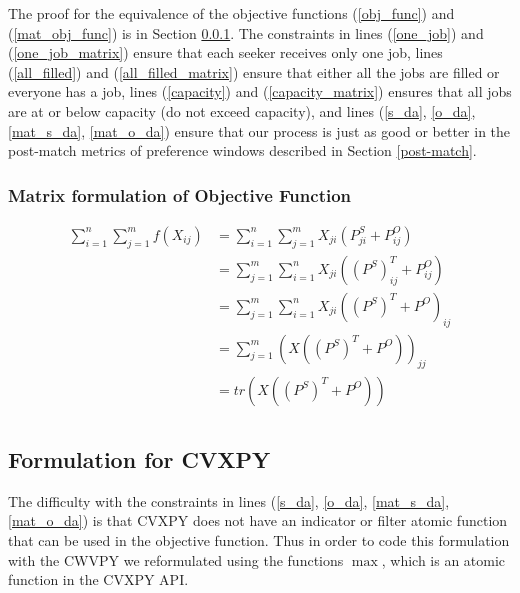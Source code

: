 The proof for the equivalence of the objective functions (\ref{obj_func}) and (\ref{mat_obj_func}) is in Section \ref{mat_obj_func_proof}. The constraints in lines (\ref{one_job}) and (\ref{one_job_matrix}) ensure that each seeker receives only one job, lines (\ref{all_filled}) and (\ref{all_filled_matrix}) ensure that either all the jobs are filled or everyone has a job, lines (\ref{capacity}) and (\ref{capacity_matrix}) ensures that all jobs are at or below capacity (do not exceed capacity), and lines (\ref{s_da}, \ref{o_da}, \ref{mat_s_da}, \ref{mat_o_da}) ensure that our process is just as good or better in the post-match metrics of preference windows described in Section \ref{post-match}.

\subsubsection{Matrix formulation of Objective Function}
\label{mat_obj_func_proof}

\begin{align}
\sum_{i = 1}^{n} \sum_{j = 1}^{m} f(X_{ij}) &= \sum_{i = 1}^{n} \sum_{j = 1}^{m} X_{ji}\left(P^S_{ji} + P^O_{ij}\right)\\
&=   \sum_{j = 1}^{m}\sum_{i = 1}^{n} X_{ji}\left(\left(P^S\right)^T_{ij} + P^O_{ij}\right)\\
&=   \sum_{j = 1}^{m}\sum_{i = 1}^{n} X_{ji}\left(\left(P^S\right)^T + P^O\right)_{ij}\\
&=   \sum_{j = 1}^{m} \left( X\left(\left(P^S\right)^T + P^O \right)\right)_{jj}\\
&=   tr\left( X\left(\left(P^S\right)^T + P^O \right)\right)\\
\end{align}

\subsection{Formulation for CVXPY}

The difficulty with the constraints in lines (\ref{s_da}, \ref{o_da}, \ref{mat_s_da}, \ref{mat_o_da}) is that CVXPY does not have an indicator or filter atomic function that can be used in the objective function. Thus in order to code this formulation with the CWVPY we reformulated using the functions $\max$, which is an atomic function in the CVXPY API.

